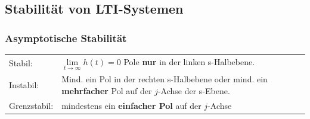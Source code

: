 \subsection{Stabilität von LTI-Systemen}
\subsubsection{Asymptotische Stabilität }
\begin{tabular}{ll}
Stabil: 
	& $\lim\limits_{t\rightarrow\infty} h(t) = 0$ 
	\qquad Pole \textbf{nur} in der
linken s-Halbebene.\\
Instabil: 
	& Mind. ein Pol in der rechten s-Halbebene oder mind. ein
\textbf{mehrfacher} Pol auf der $j$-Achse der s-Ebene. \\
Grenzstabil:
	& mindestens ein \textbf{einfacher Pol} auf der $j$-Achse
\end{tabular}

